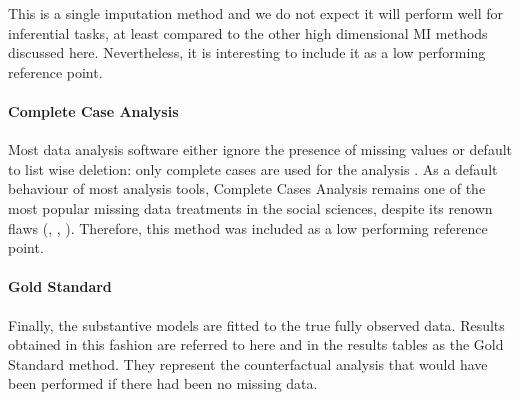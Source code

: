 	This is a single imputation method and we do not expect it will perform well for inferential tasks,
	at least compared to the other high dimensional MI methods discussed here.
	Nevertheless, it is interesting to include it as a low performing reference point.

\paragraph{Complete Case Analysis}
	Most data analysis software either ignore the presence of missing values or default to list wise deletion: only 
	complete cases are used for the analysis \citep{R:2020, pandas:2020}.
	As a default behaviour of most analysis tools, Complete Cases Analysis remains one of the most popular missing 
	data treatments in the social sciences, despite its renown flaws (\cite[p. 8]{rubin:1987}, \cite[p. 9]{vanBuuren:2012}, 
	\cite{baraldiEnders:2010}).
	Therefore, this method was included as a low performing reference point.
\iffalse 
\paragraph{Mean Imputation}
	In the social sciences, and especially in the analysis of social surveys, imputing the mean of the observed values 
	on a variable is still a quite popular choice in dealing with missing data. 
	Therefore, we include this method to portray a picture of the possible improvements the different high-dimensional
	imputation algorithms can achieve.
\fi	
\paragraph{Gold Standard}
	Finally, the substantive models are fitted to the true fully observed data. 
	Results obtained in this fashion are referred to here and in the results tables as the Gold Standard method.
	They represent the counterfactual analysis that would have been performed if there had been no missing data.
